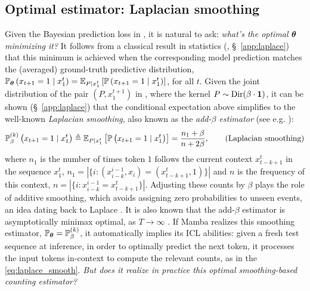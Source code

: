 \subsection{Optimal estimator: Laplacian smoothing}
\label{sec:laplace}
Given the Bayesian prediction loss in , it is natural to ask: \emph{what's the optimal $\boldsymbol{\theta}$ minimizing it?} It follows from a classical result in statistics (\cite{rissanen1984}, \S~\ref{app:laplace}) that this minimum is achieved when the corresponding model prediction matches the (averaged) ground-truth predictive distribution, \ie $\mathbb{P}_{\boldsymbol{\theta}}\left( x_{t+1}= 1 \mid x_1^t \right) = \mathbb{E}_{P|x_1^t} \left[  \mathbb{P}\left(x_{t+1} =1 \mid x_1^t\right) \right] $, for all $t$. Given the joint distribution of the pair $(P, x_1^{t+1})$ in , where the kernel $P \sim \mathrm{Dir}(\beta \cdot \bm{1})$, it can be shown (\S~\ref{app:laplace}) that the conditional expectation above simplifies to the well-known \emph{Laplacian smoothing}, also known as the \emph{add-$\beta$ estimator} (see e.g. \cite{merhav1998}):
\begin{align}
\mathbb{P}_\beta^{(k)}\left( x_{t+1} = 1 \mid x_1^{t} \right)   \triangleq \mathbb{E}_{P|x_1^t} \left[  \mathbb{P}\left(x_{t+1} =1 \mid x_1^t\right) \right]  =  \frac{n_1 + \beta}{n + 2 \beta},   
\tag{Laplacian smoothing}
\label{eq:laplace_smooth}
\end{align}
where $n_1$ is the number of times token $1$ follows the current \kth context $x_{t-k+1}^t$ in the sequence $x_1^t$, \ie $n_1 = | \{ i: (x_{i-k}^{i-1}, x_i) = (x_{t-k+1}^t, 1) \}  |  $ and $n$ is the frequency of this context, \ie $ n = | \{ i: x_{i-k}^{i-1} = x_{t-k+1}^t \}  | $. Adjusting these counts by $\beta$ plays the role of additive smoothing, which avoids assigning zero probabilities to unseen events, an idea dating back to Laplace \cite{laplace1814essaiprob}. It is also known that the add-$\beta$ estimator is asymptotically minimax optimal, as $T\to\infty$ \cite{xie-barron-1997, orlitsky2018mc}. If Mamba realizes this smoothing estimator, \ie $\mathbb{P}_{\boldsymbol{\theta}} = \mathbb{P}_{\beta}^{(k)}$, it automatically implies its ICL abilities: given a fresh test sequence at inference, in order to optimally predict the next token, it processes the input tokens in-context to compute the relevant counts, as in the \ref{eq:laplace_smooth}. \emph{But does it realize in practice this optimal smoothing-based counting estimator?}